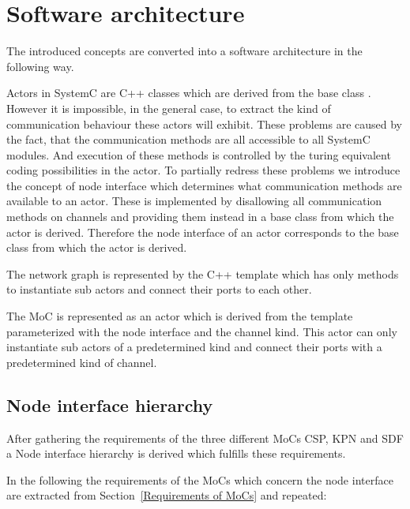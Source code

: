 
\section{Software architecture}
The introduced concepts are converted into a software architecture in the following way.

Actors in SystemC are C++ classes which are derived from the base class .
However it is impossible, in the general case, to extract the kind of communication
behaviour these actors will exhibit. These problems are caused by the fact, that the
communication methods are all accessible to all SystemC modules. And execution
of these methods is controlled by the turing equivalent coding possibilities in the actor.
To partially redress these problems we introduce the concept of node interface which
determines what communication methods are available to an actor. These is implemented
by disallowing all communication methods on \SysteMoC{} channels and providing them instead
in a base class from which the actor is derived. Therefore the node interface of an actor
corresponds to the base class from which the actor is derived.

The network graph is represented by the C++ template  
which has only methods to instantiate sub actors and connect their ports to each other.

The MoC is represented as an actor which is derived from the 
template parameterized with the node interface and the channel kind. This actor can only
instantiate sub actors of a predetermined kind and connect their ports with a  predetermined
kind of channel.

\subsection{Node interface hierarchy}
After gathering the requirements of the three different MoCs CSP, KPN
and SDF a Node interface hierarchy is derived which fulfills these requirements.

In the following the requirements of the MoCs which concern the node interface are
extracted from Section~\ref{Requirements of MoCs} and repeated:

